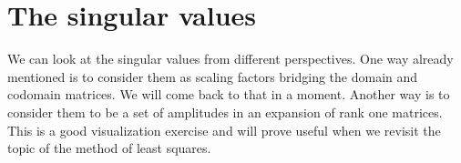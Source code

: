\chapter[]{The singular values}

We can look at the singular values from different perspectives. One way already mentioned is to consider them as scaling factors bridging the domain and codomain matrices. We will come back to that in a moment. Another way is to consider them to be a set of amplitudes in an expansion of rank one matrices. This is a good visualization exercise and will prove useful when we revisit the topic of the method of least squares.


% 
%

\endinput